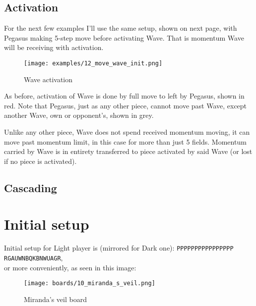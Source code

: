 \subsection*{Activation}

For the next few examples I'll use the same setup, shown on next
page, with Pegasus making 5-step move before activating Wave. That
is momentum Wave will be receiving with activation.

\clearpage

\noindent
\begin{figure}[h]
\texttt{[image: examples/12\_move\_wave\_init.png]}
\caption{Wave activation}
\label{fig:wave_activation}
\end{figure}

As before, activation of Wave is done by full move to left by Pegasus,
shown in red. Note that Pegasus, just as any other piece, cannot move
past Wave, except another Wave, own or opponent's, shown in grey.

\clearpage

Unlike any
other piece, Wave does not spend received momentum moving, it can
move past momentum limit, in this case for more than just 5 fields.
Momentum carried by Wave is in entirety transferred to piece
activated by said Wave (or lost if no piece is activated).

\clearpage

\subsection*{Cascading}

\clearpage

\section*{Initial setup}

Initial setup for Light player is (mirrored for Dark one):
\texttt{PPPPPPPPPPPPPPPP \\
        RGAUWNBQKBNWUAGR}, \\
or more conveniently, as seen in this image:

\noindent
\begin{figure}[h]
\texttt{[image: boards/10\_miranda\_s\_veil.png]}
\caption{Miranda's veil board}
\label{fig:miranda_s_veil}
\end{figure}

\clearpage

